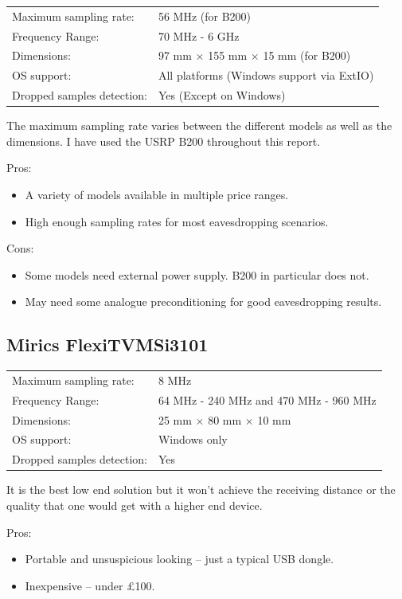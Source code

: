 \documentclass[a4paper,12pt,twoside,openright]{report}
\begin{document}
\begin{tabular}{ll}
	Maximum sampling rate: & 56 MHz (for B200) \\
	Frequency Range: & 70 MHz - 6 GHz \\
	Dimensions: & 97 mm $\times$ 155 mm $\times$ 15 mm (for B200) \\
	OS support: & All platforms (Windows support via ExtIO) \\
	Dropped samples detection: & Yes (Except on Windows)
\end{tabular}

The maximum sampling rate varies between the different models as well as the dimensions. I have used the USRP B200 throughout this report.

Pros:
\begin{itemize}
	\item A variety of models available in multiple price ranges.
	\item High enough sampling rates for most eavesdropping scenarios.
\end{itemize}

Cons:
\begin{itemize}
	\item Some models need external power supply. B200 in particular does not.
	\item May need some analogue preconditioning for good eavesdropping results.
\end{itemize}

\subsection{Mirics FlexiTV\texttrademark MSi3101}

\begin{tabular}{ll}
	Maximum sampling rate: & 8 MHz \\
	Frequency Range: & 64 MHz - 240 MHz and 470 MHz - 960 MHz \\
	Dimensions: & 25 mm $\times$ 80 mm $\times$ 10 mm \\
	OS support: & Windows only \\
	Dropped samples detection: & Yes
\end{tabular}

It is the best low end solution but it won't achieve the receiving distance or the quality that one would get with a higher end device.

Pros:
\begin{itemize}
	\item Portable and unsuspicious looking -- just a typical USB dongle.
	\item Inexpensive -- under \pounds 100.
\end{itemize}
\end{document}
